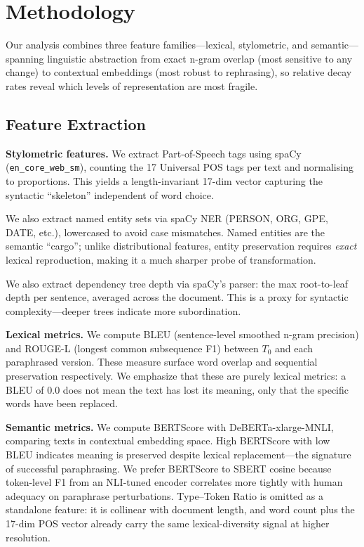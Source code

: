 \section{Methodology}

Our analysis combines three feature families---lexical, stylometric, and semantic---spanning linguistic abstraction from exact n-gram overlap (most sensitive to any change) to contextual embeddings (most robust to rephrasing), so relative decay rates reveal which levels of representation are most fragile.

\subsection{Feature Extraction}

\textbf{Stylometric features.} We extract Part-of-Speech tags using spaCy \cite{honnibal2020spacy} (\texttt{en\_core\_web\_sm}), counting the 17 Universal POS tags per text and normalising to proportions. This yields a length-invariant 17-dim vector capturing the syntactic ``skeleton'' independent of word choice.

We also extract named entity sets via spaCy NER (PERSON, ORG, GPE, DATE, etc.), lowercased to avoid case mismatches. Named entities are the semantic ``cargo''; unlike distributional features, entity preservation requires \emph{exact} lexical reproduction, making it a much sharper probe of transformation.

We also extract dependency tree depth via spaCy's parser: the max root-to-leaf depth per sentence, averaged across the document. This is a proxy for syntactic complexity---deeper trees indicate more subordination.

\textbf{Lexical metrics.} We compute BLEU \cite{papineni2002bleu} (sentence-level smoothed n-gram precision) and ROUGE-L \cite{lin2004rouge} (longest common subsequence F1) between $T_0$ and each paraphrased version. These measure surface word overlap and sequential preservation respectively. We emphasize that these are purely lexical metrics: a BLEU of 0.0 does not mean the text has lost its meaning, only that the specific words have been replaced.

\textbf{Semantic metrics.} We compute BERTScore \cite{zhang2020bertscore} with DeBERTa-xlarge-MNLI, comparing texts in contextual embedding space. High BERTScore with low BLEU indicates meaning is preserved despite lexical replacement---the signature of successful paraphrasing. We prefer BERTScore to SBERT cosine because token-level F1 from an NLI-tuned encoder correlates more tightly with human adequacy on paraphrase perturbations. Type--Token Ratio is omitted as a standalone feature: it is collinear with document length, and word count plus the 17-dim POS vector already carry the same lexical-diversity signal at higher resolution.

